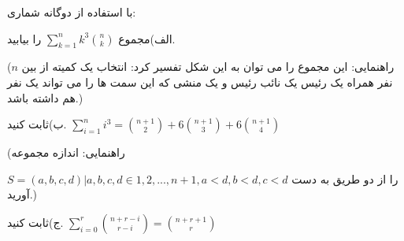 \exercise
با استفاده از دوگانه شماری:

الف)مجموع
$\sum_{k=1}^{n} k^3 \binom n k$
را بیابید.

(راهنمایی: این مجموع را می توان به این شکل تفسیر کرد: انتخاب یک کمیته از بین
$n$
نفر همراه یک ‬‬‫رئیس‬ یک ‫نائب‬ ‫رئیس‬ و یک منشی که این سمت ها را می تواند یک نفر هم داشته باشد.)

ب)ثابت کنید.
$\sum_{i=1}^{n}i^3 = \binom{n+1}{2} + 6\binom{n+1}{3} + 6\binom{n+1}{4}$

(راهنمایی:
 اندازه مجموعه
 
$S = {(a, b, c, d) | a, b, c, d \in {1, 2, ..., n + 1}, a < d , b < d, c < d}$
را از دو طریق به دست آورید.)

ج)ثابت کنید.
$\sum_{i=0}^{r}\binom{n+r-i}{r-i} = \binom{n+r+1}{r}$